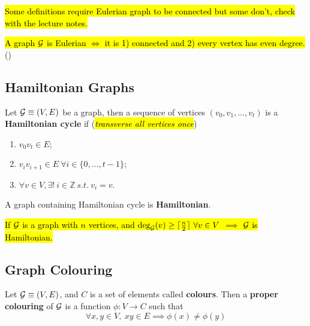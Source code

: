 \documentclass{article}
\def\Z{{\mathbb Z}}
\begin{document}
			\begin{remark}
				\hl{Some definitions require Eulerian graph to be connected but some don't, check with the lecture notes.}
			\end{remark}
			
			\begin{theorem}
				\hl{A graph $\mathcal{{G}}$ is Eulerian $\iff$ it is 1) connected and 2) every vertex has even degree.}()
			\end{theorem}
		
		\subsection{Hamiltonian Graphs}
			\begin{definition}
				Let $\mathcal{{G}} \equiv (V, E)$ be a graph, then a sequence of vertices $(v_0, v_1, \dots, v_t)$ is a \textbf{Hamiltonian cycle} if (\hl{\emph{transverse all vertices once}})
				\begin{enumerate}
					\item $v_0 v_t \in E$;
					\item $v_i v_{i+1} \in E\ \forall i \in \{0, \dots, t-1\}$;
					\item $\forall v \in V, \exists!\ i \in \Z\ s.t.\ v_i = v$.
				\end{enumerate}
			\end{definition}
			
			\begin{definition}
				A graph containing Hamiltonian cycle is \textbf{Hamiltonian}.
			\end{definition}
			
			\begin{theorem}
				\hl{If $\mathcal{{G}}$ is a graph with $n$ vertices, and $\text{{deg}}_{\mathcal{{G}}}(v) \geq \lceil \frac{n}{2} \rceil\ \forall v \in V$ $\implies$ $\mathcal{{G}}$ is Hamiltonian.}
			\end{theorem}
			
		\subsection{Graph Colouring}
			\begin{definition}
				Let $\mathcal{{G}} \equiv (V, E)$, and $C$ is a set of elements called \textbf{colours}. Then a \textbf{proper colouring} of $\mathcal{{G}}$ is a function $\phi:V \to C$ such that 
				\begin{equation}
					\forall x, y \in V,\ xy \in E \implies \phi(x) \neq \phi(y)
				\end{equation}
			\end{definition}
			
\end{document}
